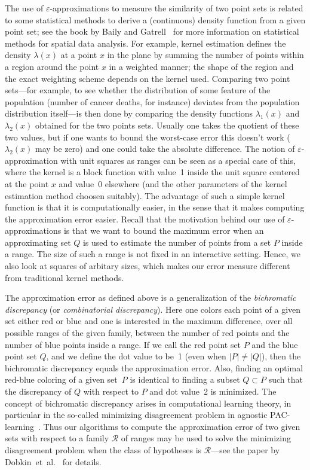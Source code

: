 \documentclass{elsart}
\newcommand{\eps}{\varepsilon}               %
\newcommand{\ranges}{{\mathcal R}}
\begin{document}
The use of $\eps$-approximations to measure the similarity of two
point sets is related to some statistical methods to derive a
(continuous) density function from a given point set; see the book by
Baily and Gatrell~\cite{bg-isda-95} for more information on
statistical methods for spatial data analysis.  For example, kernel
estimation defines the density $\lambda(x)$ at a point $x$ in the
plane by summing the number of points within a region around the point
$x$ in a weighted manner; the shape of the region and the exact
weighting scheme depends on the kernel used.  Comparing two point
sets---for example, to see whether the distribution of some feature of
the population (number of cancer deaths, for instance) deviates from
the population distribution itself---is then done by comparing the
density functions $\lambda_1(x)$ and $\lambda_2(x)$ obtained for the
two points sets. Usually one takes the quotient of these two values,
but if one wants to bound the worst-case error this doesn't work
($\lambda_2(x)$ may be zero) and one could take the absolute
difference.  The notion of $\eps$-approximation with unit squares as
ranges can be seen as a special case of this, where the kernel is a
block function with value~1 inside the unit square centered at the
point $x$ and value~0 elsewhere (and the other parameters of the
kernel estimation method choosen suitably).  The advantage of such a
simple kernel function is that it is computationally easier, in the
sense that it makes computing the approximation error easier.  Recall
that the motivation behind our use of $\eps$-approximations is that we
want to bound the maximum error when an approximating set $Q$ is used
to estimate the number of points from a set $P$ inside a range. The
size of such a range is not fixed in an interactive setting. Hence, we
also look at squares of arbitary sizes, which makes our error measure
different from traditional kernel methods.

The approximation error as defined above is a generalization of the
\emph{bichromatic discrepancy} (or \emph{combinatorial discrepancy}).
Here one colors each point of a given set either red or blue and one
is interested in the maximum difference, over all possible ranges of
the given family, between the number of red points and the number of
blue points inside a range.  If we call the red point set $P$ and the
blue point set $Q$, and we define the dot value to be~1 (even when
$|P| \neq |Q|$), then the bichromatic discrepancy equals the
approximation error.  Also, finding an optimal red-blue coloring of a
given set~$P$ is identical to finding a subset $Q \subset P$ such that
the discrepancy of $Q$ with respect to $P$ and dot value~2 is
minimized.  The concept of bichromatic discrepancy arises in
computational learning theory, in particular in the so-called
minimizing disagreement problem in agnostic
PAC-learning~\cite{dg95,gk00}.  Thus our algorithms to compute the
approximation error of two given sets with respect to a family
$\ranges$ of ranges may be used to solve the minimizing disagreement
problem when the class of hypotheses is $\ranges$---see the paper by
Dobkin~et~al.~\cite{dgm96} for details.
\end{document}
